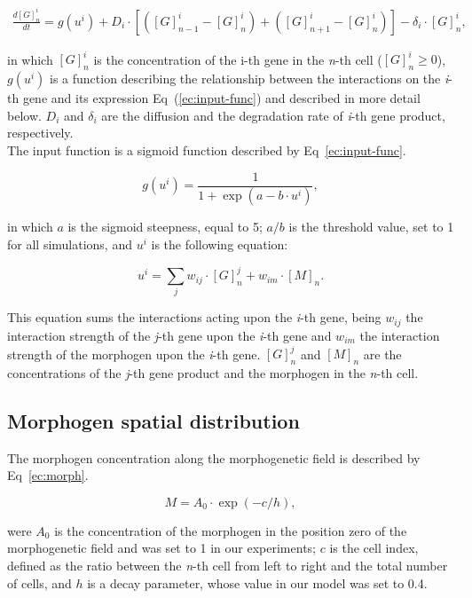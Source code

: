 \documentclass[10pt,letterpaper]{article}
\begin{document}
 \begin{eqnarray}
  \frac{d[G]^i_n}{dt}
  = g(u^i) + D_i \cdot [ ([G]^i_{n-1}-[G]^i_n) +([G]^i_{n+1}-[G]^i_n)]-\delta_i 
  \cdot [ G ]^i_n ,
  \label{ec:modelo-gral}
 \end{eqnarray}

in which $[G]^{i}_{n}$ is the concentration of the i-th gene in the \emph{n}-th 
cell ($[G]^{i}_{n} ≥ 0$), $g(u^i)$ is a function describing the relationship 
between the interactions on the \emph{i}-th gene and its expression 
Eq~(\ref{ec:input-func}) and described in more detail below. $D_i$ and 
$\delta_i$ are the diffusion and the degradation rate of \emph{i}-th gene 
product, respectively.\\

The input function is a sigmoid function described by Eq~\ref{ec:input-func}.

\begin{equation}
 g(u^i) = \frac{1}{1 + \exp(a - b \cdot u^i)},
 \label{ec:input-func}
\end{equation}

in which $a$ is the sigmoid steepness, equal to 5; $a/b$ is the threshold value,
set to 1 for all simulations, and $u^i$ is the following equation:

\begin{equation}
 u^i = \sum_j w_{ij} \cdot [G]^j_n + w_{im} \cdot [M]_n.
 \label{ec:mat-sum}
\end{equation}

This equation sums the interactions acting upon the \emph{i}-th gene, being 
$w_{ij}$ the interaction strength of the \emph{j}-th gene upon the \emph{i}-th 
gene and $w_{im}$ the interaction strength of the morphogen upon the \emph{i}-th
gene. $[G]^j_n$ and $[M]_n$ are the concentrations of the \emph{j}-th gene 
product and the morphogen in the \emph{n}-th cell.

\subsection*{Morphogen spatial distribution}

The morphogen concentration along the morphogenetic field is described by 
Eq~\ref{ec:morph}.

\begin{equation}
 M = A_0 \cdot \exp(-c/h),
 \label{ec:morph}
\end{equation}

were $A_0$ is the concentration of the morphogen in the position zero of the 
morphogenetic field and was set to 1 in our experiments; $c$ is the cell index, 
defined as the ratio between the \emph{n}-th cell from left to right and the 
total number of cells, and $h$ is a decay parameter, whose value in our model 
was set to 0.4.
\end{document}
